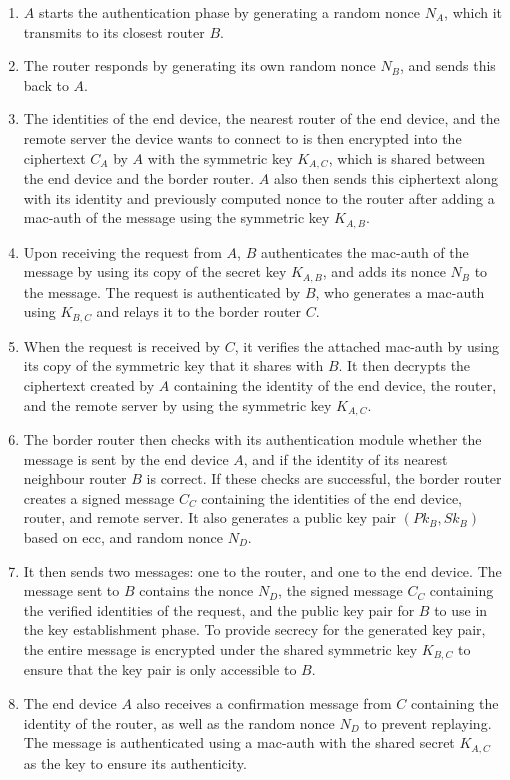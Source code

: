 \begin{enumerate}

\item $A$ starts the authentication phase by generating a random nonce $N_A$, which it transmits to its closest router $B$.

\item The router responds by generating its own random nonce $N_B$, and sends this back to $A$.

\item The identities of the end device, the nearest router of the end device, and the remote server the device wants to connect to is then encrypted into the ciphertext $C_A$ by $A$ with the symmetric key $K_{A,C}$, which is shared between the end device and the border router. $A$ also then sends this ciphertext along with its identity and previously computed nonce to the router after adding a \gls{mac-auth} of the message using the symmetric key $K_{A,B}$.

\item Upon receiving the request from $A$, $B$ authenticates the \gls{mac-auth} of the message by using its copy of the secret key $K_{A,B}$, and adds its nonce $N_B$ to the message. The request is authenticated by $B$, who generates a \gls{mac-auth} using $K_{B,C}$ and relays it to the border router $C$.

\item When the request is received by $C$, it verifies the attached \gls{mac-auth} by using its copy of the symmetric key that it shares with $B$. It then decrypts the ciphertext created by $A$ containing the identity of the end device, the router, and the remote server by using the symmetric key $K_{A,C}$.

\item The border router then checks with its authentication module whether the message is sent by the end device $A$, and if the identity of its nearest neighbour router $B$ is correct. If these checks are successful, the border router creates a signed message $C_C$ containing the identities of the end device, router, and remote server. It also generates a public key pair $(Pk_B, Sk_B)$ based on \gls{ecc}, and random nonce $N_D$.

\item It then sends two messages: one to the router, and one to the end device. The message sent to $B$ contains the nonce $N_D$, the signed message $C_C$ containing the verified identities of the request, and the public key pair for $B$ to use in the key establishment phase. To provide secrecy for the generated key pair, the entire message is encrypted under the shared symmetric key $K_{B,C}$ to ensure that the key pair is only accessible to $B$.

\item The end device $A$ also receives a confirmation message from $C$ containing the identity of the router, as well as the random nonce $N_D$ to prevent replaying. The message is authenticated using a \gls{mac-auth} with the shared secret $K_{A,C}$ as the key to ensure its authenticity.

\end{enumerate}



